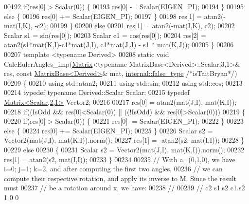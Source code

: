 \begin{DoxyCode}
00192         \textcolor{keywordflow}{if}(res[0] > Scalar(0)) \{
00193           res[0] -= Scalar(EIGEN\_PI);
00194         \}
00195         \textcolor{keywordflow}{else} \{
00196           res[0] += Scalar(EIGEN\_PI);
00197         \}
00198         res[1] = atan2(-mat(I,K), -c2);
00199       \}
00200       \textcolor{keywordflow}{else}
00201         res[1] = atan2(-mat(I,K), c2);
00202       Scalar s1 = sin(res[0]);
00203       Scalar c1 = cos(res[0]);
00204       res[2] = atan2(s1*mat(K,I)-c1*mat(J,I), c1*mat(J,J) - s1 * mat(K,J));
00205     \}
00206 
00207     \textcolor{keyword}{template} <\textcolor{keyword}{typename} Derived>
00208     \textcolor{keyword}{static} \textcolor{keywordtype}{void} CalcEulerAngles\_imp(\hyperlink{group___core___module_class_eigen_1_1_matrix}{Matrix}<\textcolor{keyword}{typename} MatrixBase<Derived>::Scalar,3,1>& res, \textcolor{keyword}{const} 
      \hyperlink{group___core___module_class_eigen_1_1_matrix_base}{MatrixBase<Derived>}& mat, \hyperlink{struct_eigen_1_1internal_1_1false__type}{internal::false\_type} \textcolor{comment}{/*isTaitBryan*/})
00209     \{
00210       \textcolor{keyword}{using} std::atan2;
00211       \textcolor{keyword}{using} std::sin;
00212       \textcolor{keyword}{using} std::cos;
00213 
00214       \textcolor{keyword}{typedef} \textcolor{keyword}{typename} Derived::Scalar Scalar;
00215       \textcolor{keyword}{typedef} \hyperlink{group___core___module_class_eigen_1_1_matrix}{Matrix<Scalar,2,1>} Vector2;
00216       
00217       res[0] = atan2(mat(J,I), mat(K,I));
00218       \textcolor{keywordflow}{if}((IsOdd && res[0]<Scalar(0)) || ((!IsOdd) && res[0]>Scalar(0)))
00219       \{
00220         \textcolor{keywordflow}{if}(res[0] > Scalar(0)) \{
00221           res[0] -= Scalar(EIGEN\_PI);
00222         \}
00223         \textcolor{keywordflow}{else} \{
00224           res[0] += Scalar(EIGEN\_PI);
00225         \}
00226         Scalar s2 = Vector2(mat(J,I), mat(K,I)).norm();
00227         res[1] = -atan2(s2, mat(I,I));
00228       \}
00229       \textcolor{keywordflow}{else}
00230       \{
00231         Scalar s2 = Vector2(mat(J,I), mat(K,I)).norm();
00232         res[1] = atan2(s2, mat(I,I));
00233       \}
00234 
00235       \textcolor{comment}{// With a=(0,1,0), we have i=0; j=1; k=2, and after computing the first two angles,}
00236       \textcolor{comment}{// we can compute their respective rotation, and apply its inverse to M. Since the result must}
00237       \textcolor{comment}{// be a rotation around x, we have:}
00238       \textcolor{comment}{//}
00239       \textcolor{comment}{//  c2  s1.s2 c1.s2                   1  0   0 }

\end{DoxyCode}
